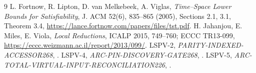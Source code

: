 \documentclass[11pt]{article}
\begin{document}
\begin{thebibliography}{9}
 L. Fortnow, R. Lipton, D. van Melkebeek, A. Viglas,
\emph{Time--Space Lower Bounds for Satisfiability}, J. ACM 52(6), 835--865
(2005), Sections 2.1, 3.1, Theorem 3.4,
\url{https://lance.fortnow.com/papers/files/tst.pdf}.
 H. Jahanjou, E. Miles, E. Viola, \emph{Local Reductions},
ICALP 2015, 749--760; ECCC TR13-099,
\url{https://eccc.weizmann.ac.il/report/2013/099/}.
 LSPV-2, \emph{PARITY-INDEXED-ACCESSOR268},
.
 LSPV-4, \emph{ARC-PIN-DISCOVERY-GATE268},
.
 LSPV-5, \emph{ARC-TOTAL-VIRTUAL-INPUT-RECONCILIATION226},
.
\end{thebibliography}
\end{document}
